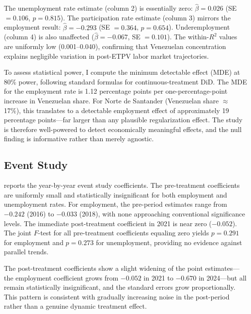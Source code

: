 \documentclass[12pt]{article}
\begin{document}
The unemployment rate estimate (column 2) is essentially zero: $\hat{\beta} = 0.026$ (SE $= 0.106$, $p = 0.815$). The participation rate estimate (column 3) mirrors the employment result: $\hat{\beta} = -0.293$ (SE $= 0.364$, $p = 0.654$). Underemployment (column 4) is also unaffected ($\hat{\beta} = -0.067$, SE $= 0.101$). The within-$R^2$ values are uniformly low (0.001--0.040), confirming that Venezuelan concentration explains negligible variation in post-ETPV labor market trajectories.



To assess statistical power, I compute the minimum detectable effect (MDE) at 80\% power, following standard formulas for continuous-treatment DiD. The MDE for the employment rate is 1.12 percentage points per one-percentage-point increase in Venezuelan share. For Norte de Santander (Venezuelan share $\approx$ 17\%), this translates to a detectable employment effect of approximately 19 percentage points---far larger than any plausible regularization effect. The study is therefore well-powered to detect economically meaningful effects, and the null finding is informative rather than merely agnostic.

\subsection{Event Study}

 reports the year-by-year event study coefficients. The pre-treatment coefficients are uniformly small and statistically insignificant for both employment and unemployment rates. For employment, the pre-period estimates range from $-0.242$ (2016) to $-0.033$ (2018), with none approaching conventional significance levels. The immediate post-treatment coefficient in 2021 is near zero ($-0.052$). The joint $F$-test for all pre-treatment coefficients equaling zero yields $p = 0.291$ for employment and $p = 0.273$ for unemployment, providing no evidence against parallel trends.



The post-treatment coefficients show a slight widening of the point estimates---the employment coefficient grows from $-0.052$ in 2021 to $-0.670$ in 2024---but all remain statistically insignificant, and the standard errors grow proportionally. This pattern is consistent with gradually increasing noise in the post-period rather than a genuine dynamic treatment effect.
\end{document}
